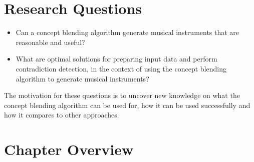 \section{Research Questions}
\begin{itemize}
\item Can a concept blending algorithm generate musical instruments that are reasonable and useful?
\item What are optimal solutions for preparing input data and perform contradiction detection, in the context of using the concept blending algorithm to generate musical instruments?
\end{itemize}
The motivation for these questions is to uncover new knowledge on what the concept blending algorithm can be used for, how it can be used successfully and how it compares to other approaches.



\section{Chapter Overview}

